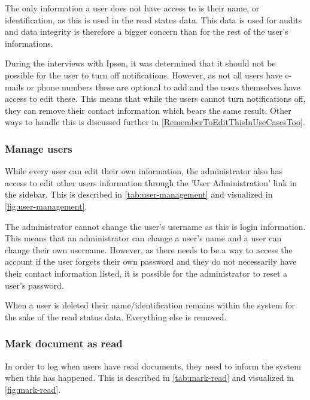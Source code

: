 


The only information a user does not have access to is their name, or identification, as this is used in the read status data.
This data is used for audits and data integrity is therefore a bigger concern than for the rest of the user's informations.

During the interviews with Ipsen, it was determined that it should not be possible for the user to turn off notifications.
However, as not all users have e-mails or phone numbers these are optional to add and the users themselves have access to edit these.
This means that while the users cannot turn notifications off, they can remove their contact information which bears the same result. 
Other ways to handle this is discussed further in \cref{RememberToEditThisInUseCasesToo}.

\subsubsection{Manage users}
While every user can edit their own information, the administrator also has access to edit other users information through the 'User Administration' link in the sidebar.
This is described in \cref{tab:user-management} and visualized in \cref{fig:user-management}.




The administrator cannot change the user's username as this is login information. 
This means that an administrator can change a user's name and a user can change their own username.
However, as there needs to be a way to access the account if the user forgets their own password and they do not necessarily have their contact information listed, it is possible for the administrator to reset a user's password.

When a user is deleted their name/identification remains within the system for the sake of the read status data.
Everything else is removed.

\subsubsection{Mark document as read}
In order to log when users have read documents, they need to inform the system when this has happened.
This is described in \cref{tab:mark-read} and visualized in \cref{fig:mark-read}.

